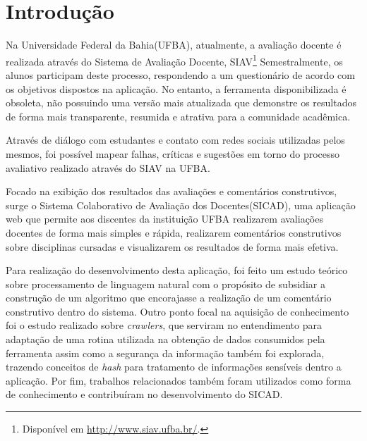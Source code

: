 \documentclass[12pt, a4paper]{report}
\begin{document}
\begin{acronym}
\end{acronym}

\chapter{Introdução}
\label{chap:introducao}

Na Universidade Federal da Bahia(\ac{UFBA}), atualmente, a avaliação docente é realizada através do Sistema de Avaliação Docente, SIAV\footnote{Disponível em \url{http://www.siav.ufba.br/}.} Semestralmente, os alunos participam deste processo, respondendo a um questionário de acordo com os objetivos dispostos na aplicação. No entanto, a  ferramenta disponibilizada é obsoleta, não possuindo uma versão mais atualizada que demonstre os resultados de forma mais transparente, resumida e atrativa para a comunidade acadêmica.

Através de diálogo com estudantes e contato com redes sociais utilizadas pelos mesmos, foi possível mapear falhas, críticas e sugestões em torno do processo  avaliativo realizado através do SIAV na \ac{UFBA}.

Focado na exibição dos resultados das avaliações e comentários construtivos, surge o Sistema Colaborativo de Avaliação dos Docentes(\ac{SICAD}), uma aplicação web que permite aos discentes da instituição UFBA realizarem avaliações docentes de forma mais simples e rápida, realizarem comentários construtivos sobre disciplinas cursadas e visualizarem os resultados de forma mais efetiva.

Para realização do desenvolvimento desta aplicação, foi feito um estudo teórico sobre processamento de linguagem natural com o propósito de subsidiar a construção de um algoritmo que encorajasse a realização de um comentário construtivo dentro do sistema. Outro ponto focal na aquisição de conhecimento foi o estudo realizado sobre \textit{crawlers}, que serviram no entendimento para adaptação de uma rotina utilizada na obtenção de dados consumidos pela ferramenta assim como a segurança da informação também foi explorada, trazendo conceitos de \textit{hash} para tratamento de informações sensíveis dentro a aplicação. Por fim, trabalhos relacionados também foram utilizados como forma de conhecimento e contribuíram no desenvolvimento do \ac{SICAD}.
\end{document}
